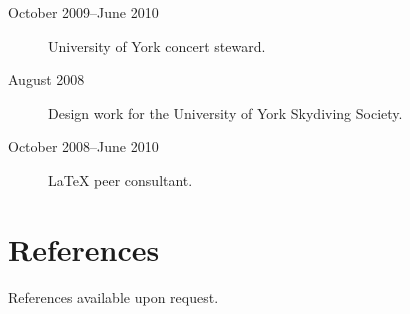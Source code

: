 \documentclass[margin,line]{resume}
\begin{document}
\begin{resume}
\begin{description}
		\item[October 2009--June 2010] University of York concert steward.

		\item[August 2008] Design work for the University of York Skydiving Society.

		\item[October 2008--June 2010] \LaTeX{} peer consultant.

	\end{description}


	\section{\mysidestyle References}\vspace{1mm}

	\begin{description}

		\item References available upon request.

	\end{description}

\end{resume}
\end{document}
